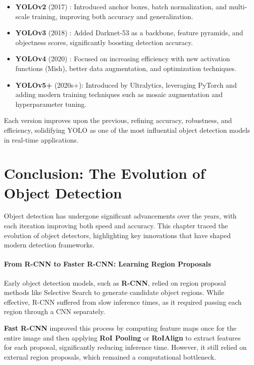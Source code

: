 \begin{enrichment}
\begin{enrichment}
        \begin{itemize}
            \item \textbf{YOLOv2} (2017) \cite{redmon2017_yolo9000}: Introduced anchor boxes, batch normalization, and multi-scale training, improving both accuracy and generalization.
            \item \textbf{YOLOv3} (2018) \cite{redmon2018_yolov3}: Added Darknet-53 as a backbone, feature pyramids, and objectness scores, significantly boosting detection accuracy.
            \item \textbf{YOLOv4} (2020) \cite{bochkovskiy2020_yolov4}: Focused on increasing efficiency with new activation functions (Mish), better data augmentation, and optimization techniques.
            \item \textbf{YOLOv5+} (2020s+): Introduced by Ultralytics, leveraging PyTorch and adding modern training techniques such as mosaic augmentation and hyperparameter tuning.
        \end{itemize}
        
        Each version improves upon the previous, refining accuracy, robustness, and efficiency, solidifying YOLO as one of the most influential object detection models in real-time applications.
        \end{enrichment}
    \end{enrichment}

\section{Conclusion: The Evolution of Object Detection}
\label{sec:chapter14_conclusion}

Object detection has undergone significant advancements over the years, with each iteration improving both speed and accuracy. This chapter traced the evolution of object detectors, highlighting key innovations that have shaped modern detection frameworks.

\paragraph{From R-CNN to Faster R-CNN: Learning Region Proposals}
Early object detection models, such as \textbf{R-CNN}, relied on region proposal methods like Selective Search to generate candidate object regions. While effective, R-CNN suffered from slow inference times, as it required passing each region through a CNN separately. 

\textbf{Fast R-CNN} improved this process by computing feature maps once for the entire image and then applying \textbf{RoI Pooling} or \textbf{RoIAlign} to extract features for each proposal, significantly reducing inference time. However, it still relied on external region proposals, which remained a computational bottleneck.


